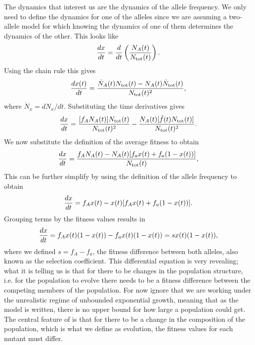 The dynamics that interest us are the dynamics of the allele frequency. We only
need to define the dynamics for one of the alleles since we are assuming a
two-allele model for which knowing the dynamics of one of them determines the
dynamics of the other. This looks like
\begin{equation}
  {d{x} \over dt} = {d{} \over dt}\left( {N_A(t) \over N_{\text{tot}}(t)} \right).
\end{equation}
Using the chain rule this gives
\begin{equation}
  {d{x(t)} \over dt} = {\dot{N}_A(t) N_{\text{tot}}(t) - N_A(t) \dot{N}_{\text{tot}}(t) \over N_{\text{tot}}(t)^2},
\end{equation}
where $\dot{N}_x = dN_x / dt$. Substituting the time derivatives gives
\begin{equation}
  {d{x} \over dt} = {[f_A N_A(t)] N_{\text{tot}}(t) \over N_{\text{tot}}(t)^2} -
           {N_A(t)[\bar{f}(t) N_{\text{tot}}(t)] \over N_{\text{tot}}(t)^2}.
\end{equation}
We now substitute the definition of the average fitness to obtain
\begin{equation}
  {d{x} \over dt} = {f_A N_A(t) - 
           N_A(t) [f_a x(t) + f_a (1 - x(t))]
          \over N_{\text{tot}}(t)},
\end{equation}
This can be further simplify by using the definition of the allele frequency to
obtain
\begin{equation}
  {d{x} \over dt} = f_A x(t) - x(t)[f_A x(t) + f_a (1 - x(t))].
\end{equation}
Grouping terms by the fitness values results in
\begin{equation}
  {d{x} \over dt} = f_A x(t)(1 - x(t)) - f_a x(t)(1 - x(t))
  = s x(t)(1 - x(t)),
  \label{eq_freq_dynamics_selection}
\end{equation}
where we defined $s = f_A - f_a$, the fitness difference between both alleles,
also known as the selection coefficient. This differential equation is very
revealing; what it is telling us is that for there to be changes in the
population structure, i.e. for the population to evolve there needs to be a
fitness difference between the competing members of the population. For now
ignore that we are working under the unrealistic regime of unbounded
exponential growth, meaning that as the model is written, there is no upper
bound for how large a population could get. The central feature of
 is that for there to be a change in the
composition of the population, which is what we define as evolution, the
fitness values for each mutant must differ. 

